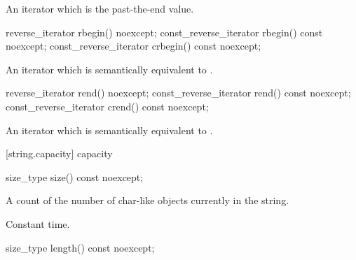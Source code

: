 \begin{itemdescr}
\pnum
\returns
An iterator which is the past-the-end value.
\end{itemdescr}

%
%
%
%
\begin{itemdecl}
reverse_iterator       rbegin() noexcept;
const_reverse_iterator rbegin() const noexcept;
const_reverse_iterator crbegin() const noexcept;
\end{itemdecl}

\begin{itemdescr}
\pnum
\returns
An iterator which is semantically equivalent to
.
\end{itemdescr}

%
%
%
%
\begin{itemdecl}
reverse_iterator       rend() noexcept;
const_reverse_iterator rend() const noexcept;
const_reverse_iterator crend() const noexcept;
\end{itemdecl}

\begin{itemdescr}
\pnum
\returns
An iterator which is semantically equivalent to
.
\end{itemdescr}

[string.capacity]{ capacity}

%
%
\begin{itemdecl}
size_type size() const noexcept;
\end{itemdecl}

\begin{itemdescr}
\pnum
\returns
A count of the number of char-like objects currently in the string.

\pnum
\complexity Constant time.
\end{itemdescr}

%
%
\begin{itemdecl}
size_type length() const noexcept;
\end{itemdecl}

